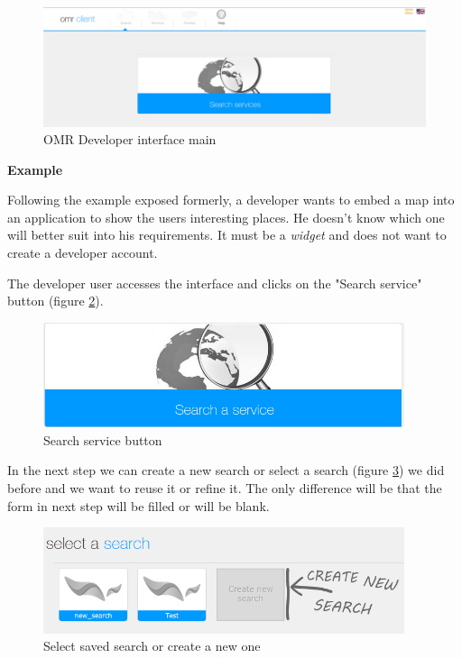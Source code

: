 \begin{figure}[h]
	\centering
	\includegraphics[width=400pt]{graphics/omr-client-main.png}
	\caption{OMR Developer interface main}
	\label{fig:searchservice}
\end{figure}


\textbf{Example}

Following the example exposed formerly, a developer wants to embed a map into an application to show the users interesting places. He doesn't know which one will better suit into his requirements. It must be a \textit{widget} and does not want to create a developer account.

The developer user accesses the interface and clicks on the "Search service" button (figure \ref{fig:searchservice}).

\begin{figure}[h]
	\centering
	\includegraphics[width=300pt]{graphics/search-service.png}
	\caption{Search service button}
	\label{fig:searchservice}
\end{figure}

In the next step we can create a new search or select a search (figure \ref{fig:selectsearch}) we did before and we want to reuse it or refine it. The only difference will be that the form in next step will be filled or will be blank.

\begin{figure}[h]
	\centering
	\includegraphics[width=300pt]{graphics/select-search.png}
	\caption{Select saved search or create a new one}
	\label{fig:selectsearch}
\end{figure}

